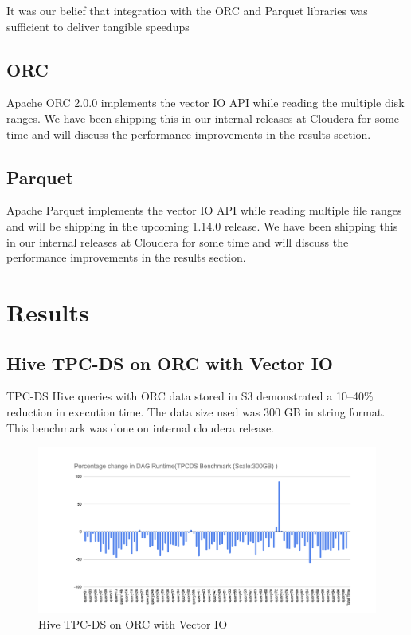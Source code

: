 \documentclass[manuscript]{acmart}
\begin{document}
It was our belief that integration with the ORC and Parquet libraries was
sufficient to deliver tangible speedups
\subsection{ORC}
Apache ORC 2.0.0 implements the vector IO API while reading the multiple disk ranges.
We have been shipping this in our internal releases at Cloudera for some time and will
discuss the performance improvements in the results section.

\subsection{Parquet}
Apache Parquet implements the vector IO API while reading multiple file ranges
and will be shipping in the upcoming 1.14.0 release.
We have been shipping this in our internal releases at Cloudera for some time and will
discuss the performance improvements in the results section.


\section{Results}
\label{sec:results}

\subsection{Hive TPC-DS on ORC with Vector IO}
TPC-DS Hive queries with ORC data stored in S3 demonstrated a 10–40\% reduction in
execution time. The data size used was 300 GB in string format. This benchmark was
done on internal cloudera release.
\begin{figure}
  \includegraphics[width=\linewidth]{hive_tpcds_vectored_io.png}
  \caption{Hive TPC-DS on ORC with Vector IO}
  \label{fig:hive_tpcds_vectored_io}
\end{figure}
\end{document}
